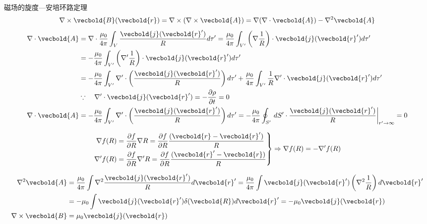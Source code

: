 \begin{thm}
    磁场的旋度---安培环路定理
    \[
\nabla \times \vecbold{B}(\vecbold{r}) = \nabla \times (\nabla \times \vecbold{A}) = \nabla(\nabla \cdot \vecbold{A}) - \nabla^2 \vecbold{A}
\]
\begin{align*}
\nabla \cdot \vecbold{A} &= \nabla \cdot \frac{\mu_0}{4\pi} 
\int_V \frac{\vecbold{j}(\vecbold{r}')}{R} d\tau' 
= \frac{\mu_0}{4\pi} \int_{V'} \left( \nabla \frac{1}{R} \right) 
\cdot \vecbold{j}(\vecbold{r}') d\tau'\\
    &=-\frac{\mu_0}{4\pi} \int_{V'} \left( \nabla' \frac{1}{R} \right) 
    \cdot \vecbold{j}(\vecbold{r}') d\tau'\\
    &=-\frac{\mu_0}{4\pi} \int_{V'} \nabla'\cdot\left(  \frac{\vecbold{j}(\vecbold{r}') }{R} \right) d\tau'
    +\frac{\mu_0}{4\pi} \int_{V'} \frac{1}{R}
    \nabla'\cdot \vecbold{j}(\vecbold{r}') d\tau'\\
    &\because\quad \nabla'\cdot \vecbold{j}(\vecbold{r}') =-\frac{\pa \rho}{\pa t}=0\\
    \nabla \cdot \vecbold{A} &=
    -\frac{\mu_0}{4\pi} \int_{V'} \nabla'\cdot\left(  \frac{\vecbold{j}(\vecbold{r}') }{R} \right) d\tau'
    =-\frac{\mu_0}{4\pi} \oint_{S'} \,d S'\cdot\frac{\vecbold{j}(\vecbold{r}') }{R}
    \bigg|_{r'\to \infty}=0
\end{align*}
\begin{zhu}
\[
\left.
\begin{aligned}
    \nabla f(R) &= \frac{\partial f}{\partial R} \nabla R = \frac{\partial f}{\partial R} \frac{(\vecbold{r} - \vecbold{r}')}{R}\\
\nabla' f(R) &= \frac{\partial f}{\partial R} \nabla' R = \frac{\partial f}{\partial R} \frac{(\vecbold{r}' - \vecbold{r})}{R}
\end{aligned}
\right\}
\Rightarrow \nabla f(R) = -\nabla' f(R)\]
\end{zhu}
\begin{align*}
    \nabla^2 \vecbold{A} &= \frac{\mu_0}{4\pi} \int \nabla^2 \frac{\vecbold{j}(\vecbold{r}')}{R} d\vecbold{r}' 
    = \frac{\mu_0}{4\pi} \int \vecbold{j}(\vecbold{r}') \left( \nabla^2 \frac{1}{R} \right) d\vecbold{r}' \\
     &= - \mu_0 \int \vecbold{j}(\vecbold{r}') \delta(\vecbold{R}) d\vecbold{r}' 
     = - \mu_0 \vecbold{j}(\vecbold{r}) \\
    \nabla \times \vecbold{B} &= \mu_0 \vecbold{j}(\vecbold{r})
\end{align*}
\end{thm}
